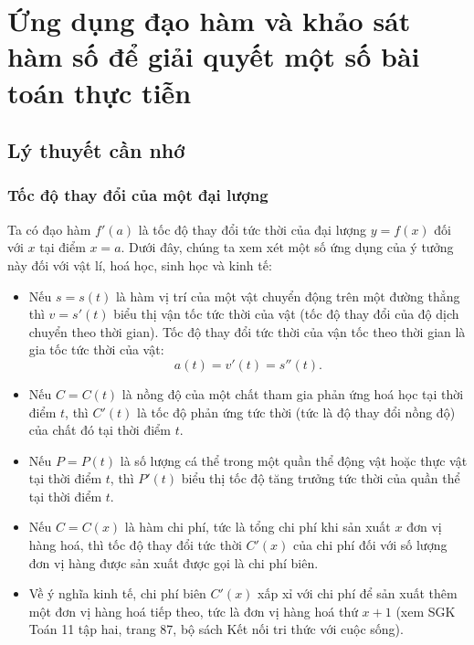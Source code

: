 \def\tenchude{ỨNG DỤNG THỰC TẾ}
\section{Ứng dụng đạo hàm và khảo sát hàm số để giải quyết một số bài toán thực tiễn}
\subsection{Lý thuyết cần nhớ}
\subsubsection{Tốc độ thay đổi của một đại lượng}
Ta có đạo hàm $f'(a)$ là tốc độ thay đổi tức thời của đại lượng $y=f(x)$ đối với $x$ tại điểm $x=a$. Dưới đây, chúng ta xem xét một số ứng dụng của ý tưởng này đối với vật lí, hoá học, sinh học và kinh tế: 
\begin{itemize}
	\item Nếu $s=s(t)$ là hàm vị trí của một vật chuyển động trên một đường thẳng thì $v=s'(t)$ biểu thị vận tốc tức thời của vật (tốc độ thay đổi của độ dịch chuyển theo thời gian). Tốc độ thay đổi tức thời của vận tốc theo thời gian là gia tốc tức thời của vật:
	$$
	a(t)=v'(t)=s''(t).
	$$
	\item Nếu $C=C(t)$ là nồng độ của một chất tham gia phản ứng hoá học tại thời điểm $t$, thì $C'(t)$ là tốc độ phản ứng tức thời (tức là độ thay đổi nồng độ) của chất đó tại thời điểm $t$.
	\item Nếu $P=P(t)$ là số lượng cá thể trong một quần thể động vật hoặc thực vật tại thời điểm $t$, thì $P'(t)$ biểu thị tốc độ tăng trưởng tức thời của quần thể tại thời điểm $t$.
	\item  Nếu $C=C(x)$ là hàm chi phí, tức là tổng chi phí khi sản xuất $x$ đơn vị hàng hoá, thì tốc độ thay đổi tức thời $C'(x)$ của chi phí đối với số lượng đơn vị hàng được sản xuất được gọi là chi phí biên.
	\item Về ý nghĩa kinh tế, chi phí biên $C'(x)$ xấp xỉ với chi phí để sản xuất thêm một đơn vị hàng hoá tiếp theo, tức là đơn vị hàng hoá thứ $x+1$ (xem SGK Toán 11 tập hai, trang 87, bộ sách Kết nối tri thức với cuộc sống). 
\end{itemize}
